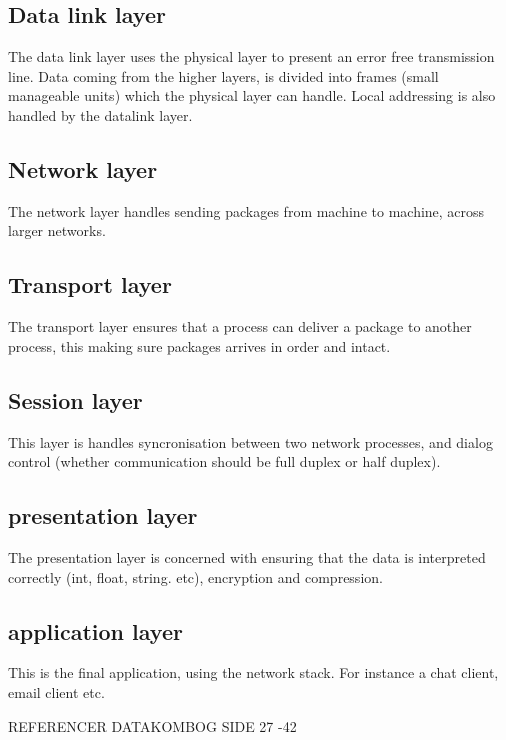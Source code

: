 \subsection{Data link layer}
The data link layer uses the physical layer to present an error free transmission line. Data coming from the higher layers, is divided into frames (small manageable units) which the physical layer can handle. Local addressing is also handled by the datalink layer.

\subsection{Network layer}
The network layer handles sending packages from machine to machine, across larger networks.

\subsection{Transport layer}
The transport layer ensures that a process can deliver a package to another process, this making sure packages arrives in order and intact.

\subsection{Session layer}
This layer is handles syncronisation between two network processes, and dialog control (whether communication should be full duplex or half duplex).

\subsection{presentation layer}
The presentation layer is concerned with ensuring that the data is interpreted correctly (int, float, string. etc), encryption and compression.

\subsection{application layer}
This is the final application, using the network stack. For instance a chat client, email client etc.





REFERENCER DATAKOMBOG SIDE 27 -42